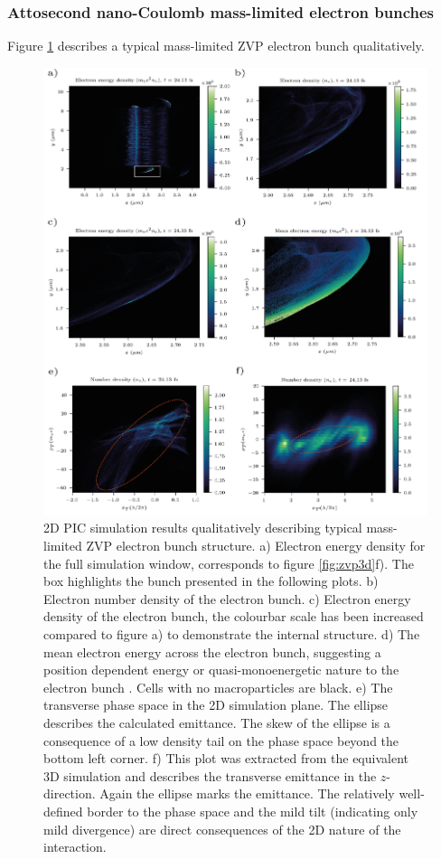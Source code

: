  \subsubsection{Attosecond nano-Coulomb mass-limited electron bunches}
 Figure \ref{fig:zvptypicalbunch} describes a typical mass-limited ZVP electron bunch qualitatively.
\begin{figure}
	\centering
	\includegraphics[width=1\linewidth]{figures/zvp/zvp_typical_bunch}
	\caption[2D PIC simulation results qualitatively describing typical mass-limited ZVP electron bunch structure.]{2D PIC simulation results qualitatively describing typical mass-limited ZVP electron bunch structure. a) Electron energy density for the full simulation window, corresponds to figure \ref{fig:zvp3d}f).  The box highlights the bunch presented in the following plots. b) Electron number density of the electron bunch. c) Electron energy density of the electron bunch, the colourbar scale has been increased compared to figure a) to demonstrate the internal structure. d) The mean electron energy across the electron bunch, suggesting a position dependent energy or quasi-monoenergetic nature to the electron bunch \cite{baevaZeroVectorPotential2011}. Cells with no macroparticles are black. e) The transverse phase space in the 2D simulation plane. The ellipse describes the calculated emittance. The skew of the ellipse is a consequence of a low density tail on the phase space beyond the bottom left corner. f) This plot was extracted from the equivalent 3D simulation and describes the transverse emittance in the $z$-direction. Again the ellipse marks the emittance. The relatively well-defined border to the phase space and the mild tilt (indicating only mild divergence) are direct consequences of the 2D nature of the interaction.}
	\label{fig:zvptypicalbunch}
\end{figure}
